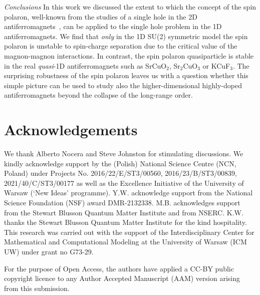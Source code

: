 \documentclass[%
 reprint,
 amsmath,amssymb,
 aps,
prl,
]{revtex4-1}
\begin{document}
{\it Conclusions}
In this work we discussed the extent to which the concept of the spin polaron, well-known from the studies of a single hole in the 2D antiferromagnets~\cite{Shr88}, can be applied to the single hole problem in the 1D antiferromagnets. We find that {\it only} in the 1D SU(2) symmetric model the spin polaron is unstable to spin-charge separation due to the critical value of the magnon-magnon interactions. In contrast, the spin polaron quasiparticle is stable in the real {\it quasi}-1D antiferromagnets such as SrCuO$_2$, Sr$_2$CuO$_3$ or KCuF$_3$.
The surprising robustness of the spin polaron leaves us with a question whether this simple picture can be used to study also the higher-dimensional highly-doped antiferromagnets beyond the collapse of the long-range order.

\section*{Acknowledgements}
We thank Alberto Nocera and Steve Johnston for stimulating discussions.
We  kindly  acknowledge  support  by  the  (Polish)  National  Science  Centre  (NCN, Poland)  under  Projects  No. 2016/22/E/ST3/00560, 2016/23/B/ST3/00839, 2021/40/C/ST3/00177 as well as the Excellence Initiative of the University of Warsaw (`New Ideas' programme).
Y.W. acknowledge support from the National Science Foundation (NSF) award DMR-2132338.
M.B. acknowledges support from the Stewart Blusson Quantum Matter Institute and from NSERC. 
K.W. thanks the Stewart Blusson Quantum Matter Institute for the kind hospitality.
This research was carried out with the support of the Interdisciplinary Center for Mathematical and Computational Modeling at the University of Warsaw (ICM UW) under grant no G73-29.


For the purpose of Open Access, the authors have applied a CC-BY public copyright licence to any
Author Accepted Manuscript (AAM) version arising from this submission.
    
\end{document}
